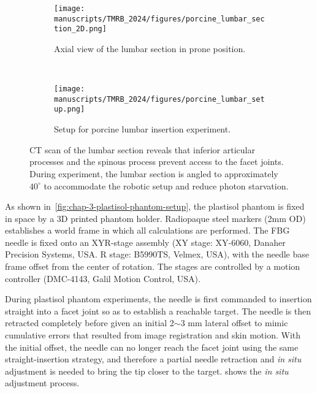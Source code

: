 \begin{figure*}[t]
\sbox{}
\setlength{\twosubht}{\ht\twosubbox}
\centering
\begin{subfigure}[t]{0.35\columnwidth}
  \centering
  \texttt{[image: manuscripts/TMRB\_2024/figures/porcine\_lumbar\_section\_2D.png]}
  \caption{Axial view of the lumbar section in prone position.}
  \label{fig:chap-3-porcine-2D}
\end{subfigure}%
~
\begin{subfigure}[t]{0.55\columnwidth}
  \texttt{[image: manuscripts/TMRB\_2024/figures/porcine\_lumbar\_setup.png]}
  \caption{Setup for porcine lumbar insertion experiment.}
  \label{fig:chap-3-porcine-setup}
\end{subfigure}
\caption{CT scan of the lumbar section reveals that inferior articular processes and the spinous process prevent access to the facet joints. During experiment, the lumbar section is angled to approximately $40^{\circ}$ to accommodate the robotic setup and reduce photon starvation.}
\end{figure*}

As shown in~\cref{fig:chap-3-plastisol-phantom-setup}, the plastisol phantom is fixed in space by a 3D printed phantom holder. Radiopaque steel markers (2mm OD) establishes a world frame in which all calculations are performed. The FBG needle is fixed onto an XYR-stage assembly (XY stage: XY-6060, Danaher Precision Systems, USA. R stage: B5990TS, Velmex, USA), with the needle base frame offset from the center of rotation. The stages are controlled by a motion controller (DMC-4143, Galil Motion Control, USA).

During plastisol phantom experiments, the needle is first commanded to insertion straight into a facet joint so as to establish a reachable target. The needle is then retracted completely before given an initial 2$\sim$3 mm lateral offset to mimic cumulative errors that resulted from image registration and skin motion. With the initial offset, the needle can no longer reach the facet joint using the same straight-insertion strategy, and therefore a partial needle retraction and \textit{in situ} adjustment is needed to bring the tip closer to the target.  shows the \textit{in situ} adjustment process.


